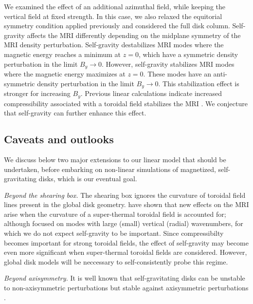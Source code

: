 
We examined the effect of an additional azimuthal field, while
keeping the vertical field at fixed strength. In this case, we also
relaxed the equitorial symmetry condition applied previously and
considered the full disk column. Self-gravity affects the MRI
differently depending on the midplane symmetry of the MRI density
perturbation. Self-gravity destabilizes MRI modes where the magnetic
energy reaches a minimum at $z=0$, which have a symmetric
density perturbation in the limit $B_y\to0$. However, 
self-gravity stabilizes MRI modes where the magnetic energy maximizes
at $z=0$. These modes have an anti-symmetric density
perturbation in the limit $B_y\to0$. This stabilization effect is
stronger for increasing $B_y$. Previous linear calculations indicate
increased compressibility associated with a toroidal field stabilizes
the MRI \citep{kim03}. We conjecture that self-gravity can
further enhance this effect.   


\subsection{Caveats and outlooks}
We discuss below two major extensions to our linear model that
should be undertaken, before embarking on non-linear simulations of
magnetized, self-gravitating disks, which is our eventual goal.  

\emph{Beyond the shearing box.} The shearing box ignores the curvature
of toroidal field lines present in the global disk 
geometry. \cite{pessah05} have shown that new effects on the MRI arise
when the curvature of a super-thermal toroidal field is accounted for;
although \citeauthor{pessah05} focused on modes with large (small)
vertical (radial) wavenumbers, for which we do not expect self-gravity
to be important. Since compressibilty becomes important for strong
toroidal fields, the effect of self-gravity may become even more
significant when super-thermal toroidal fields are
considered. However, global disk models will be neccessary
to self-consistently probe this regime. 

%




\emph{Beyond axisymmetry.} It is well known that self-gravitating
disks can be unstable to non-axisymmetric perturbations but stable
against axisymmetric perturbations \citep{papaloizou89,papaloizou91}.   



